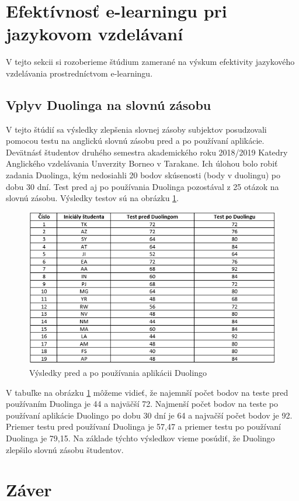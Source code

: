 \documentclass[10pt,oneside,slovak,a4paper]{article}
\begin{document}
\section{Efektívnosť e-learningu pri jazykovom vzdelávaní}
V tejto sekcii si rozoberieme štúdium zamerané na výskum efektivity jazykového vzdelávania prostredníctvom e-learningu.

\subsection{Vplyv Duolinga na slovnú zásobu}
V tejto štúdií sa výsledky zlepšenia slovnej zásoby subjektov posudzovali pomocou testu na anglickú slovnú zásobu pred a po používaní aplikácie. Devätnásť študentov druhého semestra akademického roku 2018/2019 Katedry Anglického vzdelávania Unverzity Borneo v Tarakane. Ich úlohou bolo robiť zadania Duolinga, kým nedosiahli 20 bodov skúsenosti (body v duolingu) po dobu 30 dní. Test pred aj po používania Duolinga pozostával z 25 otázok na slovnú zásobu. Výsledky testov sú na obrázku \ref{duo-studium}. \cite{duolingo}

\begin{figure}[h] %
\centering
\includegraphics{duo_studium.png}
\caption{Výsledky pred a po používania aplikácii Duolingo\cite{duolingo}}
\label{duo-studium}
\end{figure}

V tabuľke na obrázku \ref{duo-studium} môžeme vidieť, že najemnší počet bodov na teste pred používaním Duolinga je 44 a najväčší 72. Najmenší počet bodov na teste po používaní aplikácie  Duolingo po dobu 30 dní je 64 a najvačší počet bodov je 92. Priemer testu pred používaní Duolinga je 57,47 a priemer testu po používaní Duolinga je 79,15. Na základe týchto výsledkov vieme posúdiť, že Duolingo zlepšilo slovnú zásobu študentov. \cite{duolingo}

\section{Záver}



\end{document}
